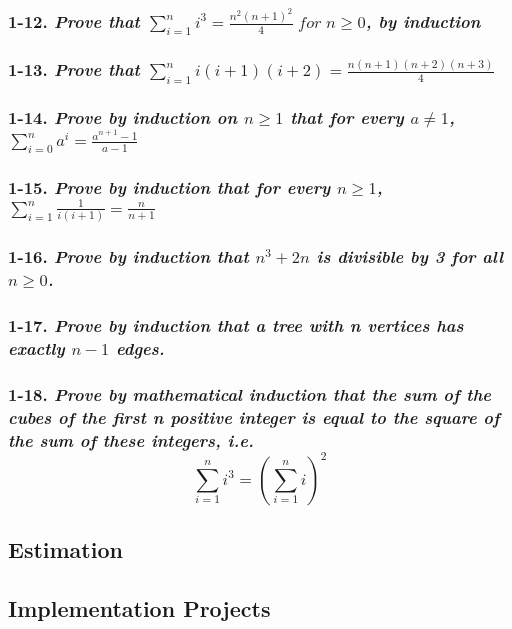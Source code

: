 {\color{pendsol}{} 

\subsubsection*{\textbf{1-12.} \emph{Prove that $\sum_{i=1}^{n}i^{3}=\frac{n^{2}(n+1)^{2}}{4} \;for\; n \geq 0$, by induction}}

\subsubsection*{\textbf{1-13.} \emph{Prove that $\sum_{i=1}^{n}i(i+1)(i+2)=\frac{n(n+1)(n+2)(n+3)}{4}$ }}

\subsubsection*{\textbf{1-14.} \emph{Prove by induction on $n\geq1$ that for every $a\neq1$,  $\sum_{i=0}^{n}a^{i} = \frac{a^{n+1} - 1}{a - 1}$}}

\subsubsection*{\textbf{1-15.} \emph{Prove by induction that for every $n\geq1$,  $\sum_{i=1}^{n}\frac{1}{i(i+1)} = \frac{n}{n+1}$}}

\subsubsection*{\textbf{1-16.} \emph{Prove by induction that $n^{3}+2n$ is divisible by 3 for all $n\geq0$.}}

\subsubsection*{\textbf{1-17.} \emph{Prove by induction that a tree with n vertices has exactly $n-1$ edges.}}

\subsubsection*{\textbf{1-18.} \emph{Prove by mathematical induction that the sum of the cubes of the first n positive integer is equal to the square of the sum of these integers, i.e.
$$\sum_{i=1}^{n}i^{3} = (\sum_{i=1}^{n}i)^{2}$$}}


}

{\color{red}{}
\subsection{Estimation}
\subsection{Implementation Projects}
}

